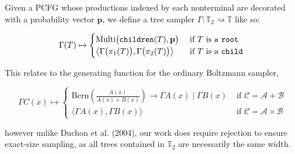\documentclass[portrait,a0b,final,a4resizeable]{a0poster}
\def\jointspacing{\vspace{0.3in}}
\begin{document}
\begin{poster}
\begin{multicols}{2}

      \jointspacing

      \hspace*{2cm}\begin{minipage}[c]{0.90\columnwidth}
      Given a PCFG whose productions indexed by each nonterminal are decorated with a probability vector $\mathbf{p}$, we define a tree sampler $\Gamma: \mathbb{T}_2 \rightsquigarrow \mathbb{T}$ like so:
      \end{minipage}

      \begin{equation*}
        \Gamma(T) \mapsto \begin{cases}
                            \text{Multi} \big(\texttt{children}(T), \mathbf{p}\big) & \text{ if $T$ is a \texttt{root}} \\
                            \big\langle \Gamma\big(\pi_1(T)\big), \Gamma\big(\pi_2(T)\big) \big\rangle & \text{ if $T$ is a \texttt{child} }
        \end{cases}
      \end{equation*}


      \hspace*{2cm}\begin{minipage}[c]{0.90\columnwidth}
      This relates to the generating function for the ordinary Boltzmann sampler,
      \end{minipage}

      \begin{equation*}
        \Gamma C(x) \mapsto \begin{cases}
                              \text{Bern} \left(\frac{A(x)}{A(x) + B(x)}\right) \rightarrow \Gamma A(x) \mid \Gamma B(x) & \text{ if } \mathcal{C}=\mathcal{A}+\mathcal{B} \\
                              \big\langle \Gamma A(x), \Gamma B(x)\big\rangle & \text{ if } \mathcal{C}=\mathcal{A} \times \mathcal{B}
        \end{cases}
      \end{equation*}


      \hspace*{2cm}\begin{minipage}[c]{0.90\columnwidth}
      however unlike Duchon et al. (2004), our work does require rejection to ensure exact-size sampling, as all trees contained in $\mathbb{T}_2$ are necessarily the same width.
      \end{minipage}

      \jointspacing


\end{multicols}
\end{poster}
\end{document}
